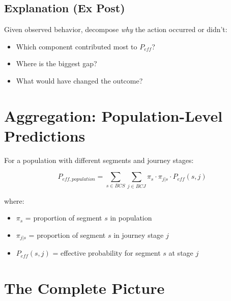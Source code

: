 \subsection{Explanation (Ex Post)}

Given observed behavior, decompose \emph{why} the action occurred or didn't:
\begin{itemize}
    \item Which component contributed most to $P_{eff}$?
    \item Where is the biggest gap?
    \item What would have changed the outcome?
\end{itemize}

\section{Aggregation: Population-Level Predictions}

For a population with different segments and journey stages:

\begin{equation}
P_{eff,population} = \sum_{s \in BCS} \sum_{j \in BCJ} 
    \pi_{s} \cdot \pi_{j|s} \cdot P_{eff}(s, j)
\end{equation}

where:
\begin{itemize}
    \item $\pi_s$ = proportion of segment $s$ in population
    \item $\pi_{j|s}$ = proportion of segment $s$ in journey stage $j$
    \item $P_{eff}(s, j)$ = effective probability for segment $s$ at stage $j$
\end{itemize}

\section{The Complete Picture}

